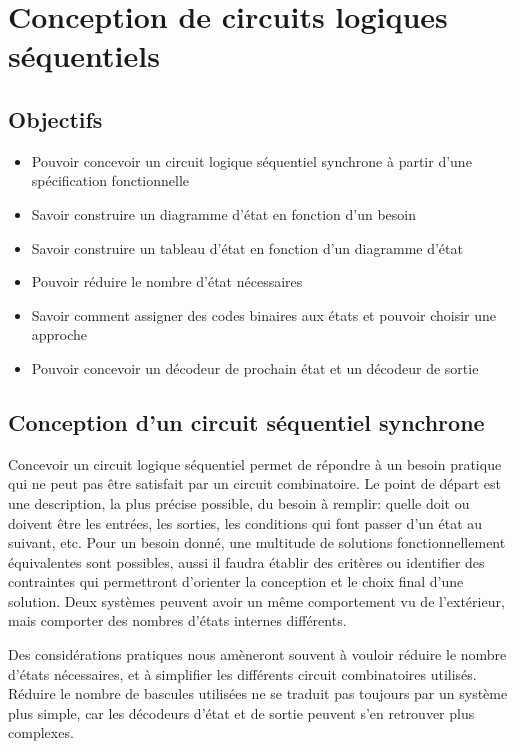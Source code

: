 \documentclass[11pt]{article}
\begin{document}
\section{Conception de circuits logiques séquentiels}
\label{sec:orga099063}
\subsection{Objectifs}
\label{sec:orgf586204}
\begin{itemize}
\item Pouvoir concevoir un circuit logique séquentiel synchrone à partir
d'une spécification fonctionnelle
\item Savoir construire un diagramme d'état en fonction d'un besoin
\item Savoir construire un tableau d'état en fonction d'un diagramme d'état
\item Pouvoir réduire le nombre d'état nécessaires
\item Savoir comment assigner des codes binaires aux états et pouvoir
choisir une approche
\item Pouvoir concevoir un décodeur de prochain état et un décodeur de sortie
\end{itemize}

\subsection{Conception d'un circuit séquentiel synchrone}
\label{sec:org1537bc2}

Concevoir un circuit logique séquentiel permet de répondre à un besoin
pratique qui ne peut pas être satisfait par un circuit combinatoire.
Le point de départ est une description, la plus précise possible, du
besoin à remplir: quelle doit ou doivent être les entrées, les
sorties, les conditions qui font passer d'un état au suivant,
etc. Pour un besoin donné, une multitude de solutions
fonctionnellement équivalentes sont possibles, aussi il faudra établir
des critères ou identifier des contraintes qui permettront d'orienter
la conception et le choix final d'une solution. Deux systèmes peuvent
avoir un même comportement vu de l'extérieur, mais comporter des
nombres d'états internes différents.

Des considérations pratiques nous amèneront souvent à vouloir réduire
le nombre d'états nécessaires, et à simplifier les différents circuit
combinatoires utilisés. Réduire le nombre de bascules utilisées ne se
traduit pas toujours par un système plus simple, car les décodeurs
d'état et de sortie peuvent s'en retrouver plus complexes.
\end{document}
